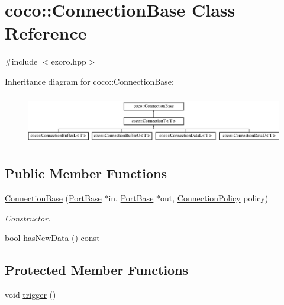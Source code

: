 \hypertarget{classcoco_1_1_connection_base}{\section{coco\-:\-:Connection\-Base Class Reference}
\label{classcoco_1_1_connection_base}
}


{\ttfamily \#include $<$ezoro.\-hpp$>$}

Inheritance diagram for coco\-:\-:Connection\-Base\-:\begin{figure}[H]
\begin{center}
\leavevmode
\includegraphics[height=2.187500cm]{classcoco_1_1_connection_base}
\end{center}
\end{figure}
\subsection*{Public Member Functions}
\begin{DoxyCompactItemize}
\item 
\hypertarget{classcoco_1_1_connection_base_aecb0c585cd9313e30f7d592ed08c6059}{\hyperlink{classcoco_1_1_connection_base_aecb0c585cd9313e30f7d592ed08c6059}{Connection\-Base} (\hyperlink{classcoco_1_1_port_base}{Port\-Base} $\ast$in, \hyperlink{classcoco_1_1_port_base}{Port\-Base} $\ast$out, \hyperlink{structcoco_1_1_connection_policy}{Connection\-Policy} policy)}\label{classcoco_1_1_connection_base_aecb0c585cd9313e30f7d592ed08c6059}

\begin{DoxyCompactList}\small\item\em Constructor. \end{DoxyCompactList}\item 
bool \hyperlink{classcoco_1_1_connection_base_aca4a3ab712e816089a1ee35cb0546d8d}{has\-New\-Data} () const 
\end{DoxyCompactItemize}
\subsection*{Protected Member Functions}
\begin{DoxyCompactItemize}
\item 
void \hyperlink{classcoco_1_1_connection_base_a48861f5913490df52b2a741a51275293}{trigger} ()
\end{DoxyCompactItemize}
